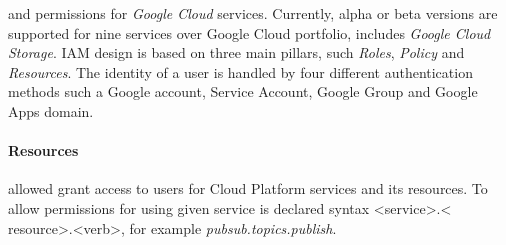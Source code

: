 \documentclass[a4paper,12pt,oneside]{report}
\begin{document}
	and permissions for \textit{Google Cloud} services. Currently, alpha  or beta
	versions are 
	supported for nine services over Google Cloud portfolio, 
	includes \textit{Google Cloud Storage}. IAM design is based on three main
	pillars, 
	such \textit{Roles}, \textit{Policy} and \textit{Resources}. The 
	identity of a user is handled by four different authentication methods such a
	Google 
	account, Service Account, Google Group and Google Apps domain.
	
	\paragraph{Resources} allowed grant access to users for Cloud Platform services
	and its resources. To allow permissions for using given 
	service is declared syntax \textless service\textgreater.\textless
	resource\textgreater.\textless verb\textgreater, for example
	\emph{pubsub.topics.publish}.
	
\end{document}
